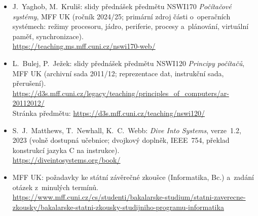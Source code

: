 \documentclass[11pt,a4paper]{article}
\begin{document}
{\raggedright
\begin{itemize}
  \item J.~Yaghob, M.~Kruliš: slidy přednášek předmětu NSWI170 \emph{Počítačové systémy}, MFF UK (ročník 2024/25; primární zdroj části o~operačních systémech: režimy procesoru, jádro, periferie, procesy a~plánování, virtuální paměť, synchronizace).\\ \url{https://teaching.ms.mff.cuni.cz/nswi170-web/}
  \item L.~Bulej, P.~Ježek: slidy přednášek předmětu NSWI120 \emph{Principy počítačů}, MFF UK (archivní sada 2011/12; reprezentace dat, instrukční sada, přerušení).\\ \url{https://d3s.mff.cuni.cz/legacy/teaching/principles_of_computers/ar-20112012/}\\ Stránka předmětu: \url{https://d3s.mff.cuni.cz/teaching/nswi120/}
  \item S.~J.~Matthews, T.~Newhall, K.~C.~Webb: \emph{Dive Into Systems}, verze~1.2, 2023 (volně dostupná učebnice; dvojkový doplněk, IEEE~754, překlad konstrukcí jazyka C na instrukce).\\ \url{https://diveintosystems.org/book/}
  \item MFF UK: požadavky ke státní závěrečné zkoušce (Informatika, Bc.) a~zadání otázek z~minulých termínů.\\ \url{https://www.mff.cuni.cz/cs/studenti/bakalarske-studium/statni-zaverecne-zkousky/bakalarske-statni-zkousky-studijniho-programu-informatika}
\end{itemize}
\par}
\end{document}
